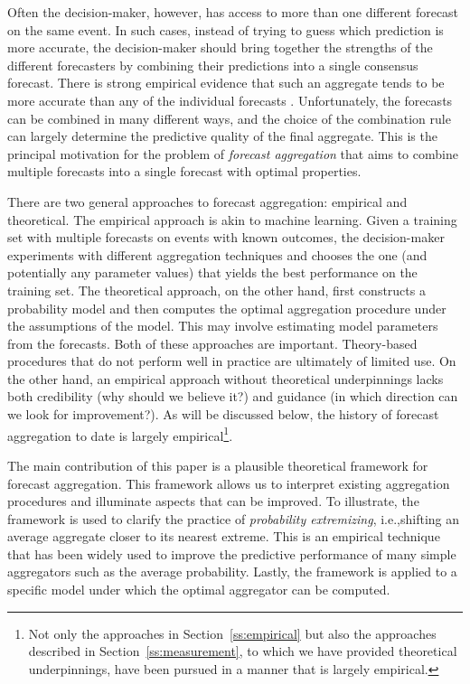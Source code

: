 \documentclass[11pt]{article}
\theoremstyle{definition}
\theoremstyle{definition}
\begin{document}
Often the decision-maker, however, has access to more than one different forecast on the same event. In such cases, instead of trying to guess which prediction is more accurate, the decision-maker should bring together the strengths of the different forecasters by combining their predictions into a single consensus forecast. There is strong empirical evidence that such an aggregate tends to be more accurate than any of the individual forecasts \citep{clemen1989combining,
armstrong2001combining}. Unfortunately, the forecasts can be combined in many different ways, and the choice of the combination
rule can largely determine the predictive quality of the final
aggregate.  
This is the principal motivation for the problem of  \textit{forecast aggregation} that aims to combine multiple forecasts into a single
forecast with optimal properties.

There are two general approaches to forecast aggregation: empirical
and theoretical.  The empirical approach is akin to machine
learning. Given a training set with multiple forecasts on events with
known outcomes, the decision-maker experiments with different
aggregation techniques and chooses the one (and potentially any
parameter values) that yields the best performance on the training set.
The theoretical approach, on the other hand, first constructs a
probability model and then computes the optimal aggregation procedure
under the assumptions of the model.  This may involve estimating model
parameters from the forecasts. Both of these approaches are important.  Theory-based procedures that do not
perform well in practice are ultimately of limited use.  On the other
hand, an empirical approach without theoretical underpinnings lacks
both credibility (why should we believe it?)  and guidance (in which
direction can we look for improvement?). As will be discussed below, the history of forecast aggregation to date is largely
empirical\footnote{Not only the approaches in
Section~\ref{ss:empirical} but also the approaches described in
Section~\ref{ss:measurement}, to which we have provided theoretical
underpinnings, have been pursued in a manner that is largely
empirical.}. 

The main contribution of this paper is a plausible
theoretical framework for forecast aggregation.  This framework allows
us to interpret existing aggregation procedures and illuminate aspects
that can be improved. To illustrate, the
framework is used to clarify the practice of {\em probability
extremizing}, i.e.,shifting an average aggregate closer to its nearest
extreme. This is an empirical technique that has been widely used to
improve the predictive performance of many simple aggregators such as
the average probability. Lastly, the framework is applied to a
specific model under which the optimal aggregator can be computed.
\end{document}

